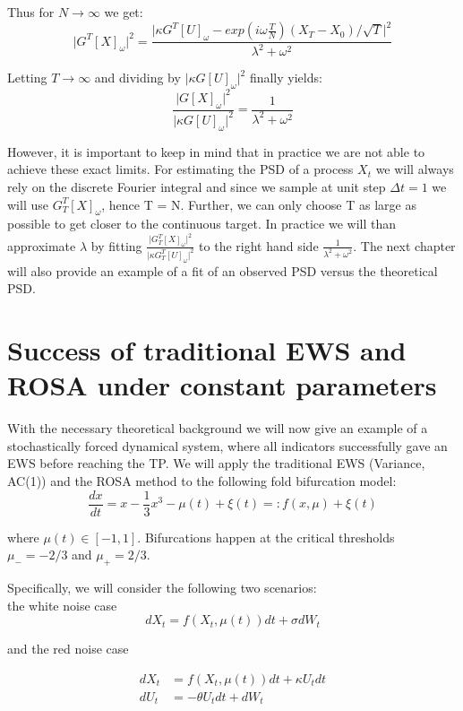 \documentclass[%
thesis=student,%
coverpage=false,%
titlepage=false,%
headmarks=true, %
english,%
font=libertine, %
math=newpxtx, %
BCOR=5mm,%
coverBCOR=11mm%
]{tumbook}
\begin{document}
Thus for $N \rightarrow \infty$ we get:
\[
    \lvert G^{T}[X]_{\omega} \rvert^2 = \frac{\lvert\kappa G^{T}[U]_{\omega} - exp(i\omega\frac{T}{N})(X_{T}-X_{0})/\sqrt{T}\rvert ^2}{\lambda^2 + \omega^2}
\]

Letting $T \rightarrow \infty$ and dividing by $\lvert\kappa G[U]_{\omega}\rvert^2$ finally yields:
\[
    \frac{\lvert G[X]_{\omega} \rvert^2}{\lvert\kappa G[U]_{\omega}\rvert^2} = \frac{1}{\lambda^2 + \omega^2}
\]

However, it is important to keep in mind that in practice we are not able to achieve these exact limits. For estimating the PSD of a process $X_{t}$ we will always rely on the discrete Fourier integral and since we sample at unit step $\Delta t = 1$ we will use $G_{T}^{T}[X]_{\omega}$, hence T = N. Further, we can only choose T as large as possible to get closer to the continuous target. In practice we will than approximate $\lambda$ by fitting $\frac{\lvert G_{T}^{T}[X]_{\omega} \rvert ^2}{\lvert \kappa G_{T}^{T}[U]_{\omega} \rvert ^2}$ to the right hand side $\frac{1}{\lambda^2 + \omega^2}$. The next chapter will also provide an example of a fit of an observed PSD versus the theoretical PSD.





\chapter{Success of traditional EWS and ROSA under constant parameters}

With the necessary theoretical background we will now give an example of a stochastically forced dynamical system, where all indicators successfully gave an EWS before reaching the TP.
We will apply the traditional EWS (Variance, AC(1)) and the ROSA method to the following fold bifurcation model: 
        \[
            \frac{dx}{dt} = x - \frac{1}{3}x^3 - \mu(t) + \xi(t) =: f(x,\mu) + \xi(t)
        \]
        
where $\mu(t) \in [-1,1]$. Bifurcations happen at the critical thresholds $\mu_{-} = -2/3$ and $\mu_{+} = 2/3$.

Specifically, we will consider the following two scenarios: \\
    the white noise case
    \[
    dX_{t} = f(X_{t},\mu(t))dt + \sigma dW_{t}
    \]

and the red noise case
    
    \begin{align*}   
    dX_{t} & = f(X_{t},\mu(t))dt + \kappa U_{t}dt \\
    dU_{t} & = -\theta U_{t} dt + dW_{t}
    \end{align*}
\end{document}
